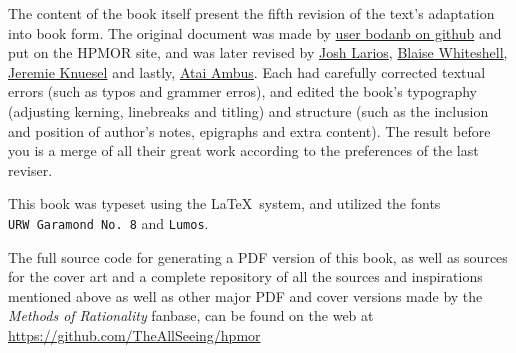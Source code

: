 {    The content of the book itself present the fifth revision of the text's adaptation into book form.
    The original document was made by \href{https://github.com/bogdanb/hpmor}{user bodanb on github}
    and put on the HPMOR site, and was later revised by \href{https://github.com/rjl20/hpmor}{Josh Larios},
    \href{https://github.com/xenohedron/hpmor-xetex}{Blaise Whiteshell}, \href{https://github.com/knuesel/hpmor}{Jeremie Knuesel}
    and lastly, \href{https://github.com/TheAllSeeing/hpmor}{Atai Ambus}. Each had carefully corrected textual
    errors (such as typos and grammer erros), and edited the book's typography (adjusting kerning, linebreaks and
    titling) and structure (such as the inclusion and position of author's notes, epigraphs and extra content).
    The result before you is a merge of all their great work according to the preferences of the last reviser.

    This book was typeset using the \LaTeX\ system, and utilized the fonts \texttt{URW~Garamond~No.~8} and \texttt{Lumos}.

    The full source code for generating a PDF version of this book, as well as sources for the cover art and
    a complete repository of all the sources and inspirations mentioned above as well as other major PDF and
    cover versions made by the \emph{Methods of Rationality} fanbase, can be found on
    the web at \url{https://github.com/TheAllSeeing/hpmor}
}
